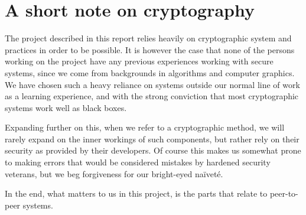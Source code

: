 \section{A short note on cryptography}

The project described in this report relies heavily on cryptographic system and practices in order to be possible. It is however the case that none of the persons working on the project have any previous experiences working with secure systems, since we come from backgrounds in algorithms and computer graphics. We have chosen such a heavy reliance on systems outside our normal line of work as a learning experience, and with the strong conviction that most cryptographic systems work well as black boxes.

Expanding further on this, when we refer to a cryptographic method, we will rarely expand on the inner workings of such components, but rather rely on their security as provided by their developers. Of course this makes us somewhat prone to making errors that would be considered mistakes by hardened security veterans, but we beg forgiveness for our bright-eyed naïveté. 

In the end, what matters to us in this project, is the parts that relate to peer-to-peer systems.
